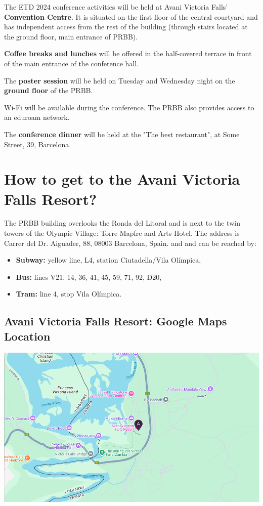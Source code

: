The ETD 2024 conference activities will be held at Avani Victoria Falls' \textbf{Convention Centre}. It is situated on the first floor of the central courtyard and
has independent access from the rest of the building (through stairs located at the ground floor, main entrance of PRBB). 

\textbf{Coffee breaks and lunches} will be offered in the half-covered terrace in front of the main entrance of the conference hall.

The \textbf{poster session} will be held on Tuesday and Wednesday night on the \textbf{ground floor} of the PRBB. 

Wi-Fi will be available during the conference. The PRBB also provides access to an eduroam network.

The \textbf{conference dinner} will be held at the "The best restaurant", at Some Street, 39, Barcelona.

\section{How to get to the Avani Victoria Falls Resort?}

The PRBB building overlooks the Ronda del Litoral and is next to the twin towers of the Olympic Village: Torre Mapfre and Arts Hotel. The address is Carrer del Dr. Aiguader, 88, 08003 Barcelona, Spain. and and can be reached by:

\begin{itemize}

	\item \textbf{Subway:} yellow line, L4, station Ciutadella/Vila Ol\'{i}mpica,
	\item \textbf{Bus:} lines V21, 14, 36, 41, 45, 59, 71, 92, D20,
	\item \textbf{Tram:} line 4, stop Vila Ol\'{i}mpica.
	
\end{itemize}

\subsection{Avani Victoria Falls Resort: Google Maps Location}

\begin{center}
\includegraphics[width=\linewidth]{images/img-etd24-avani_victoria_fall_convention_centre_map.png}
\end{center}


